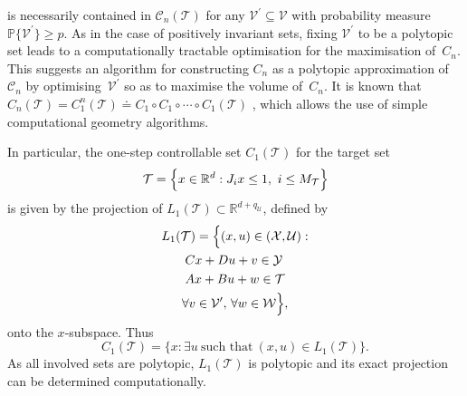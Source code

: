 \documentclass{ifacconf}
\providecommand{\C}{\mathscr C}
\providecommand{\W}{\mathcal W}
\providecommand{\V}{\mathcal V}
\providecommand{\X}{\mathcal X}
\providecommand{\Y}{\mathcal Y}
\providecommand{\U}{\mathcal U}
\providecommand{\T}{\mathcal T}
\providecommand{\PP}{\mathbb P}
\providecommand{\RR}{\mathbb R}
\begin{document}
%
is necessarily contained in $\C_n(\T)$ for any $\V^\prime\subseteq\V$ with probability measure $\PP\{\V^\prime\} \geq p$.
%
As in the case of positively invariant sets, fixing $\V^\prime$ to be a polytopic set leads to a computationally tractable optimisation for the maximisation of~$C_n$. This suggests an algorithm for constructing $C_n$ as a polytopic approximation of~$\C_n$ by optimising~$\V^\prime$ so as to maximise the volume of~$C_n$.
%
It is known that 
$C_n(\T) = C^n_1(\T) \doteq C_1 \circ C_1 \circ \cdots \circ C_1(\T)$ 
\citep[see e.g.][]{blanchini:2007}, which allows the use of simple computational geometry algorithms.

In particular, the one-step controllable set $C_1(\T)$ for the target set 
\[
\T = \Bigl\{x\in\RR^d : J_i x\leq1,\ i\leq M_\T\Bigr\}
\]
is given by the projection of
$L_1(\T)\subset \RR^{d+q_{\U}}$, 
defined by
%
\begin{multline*}
L_1(\T) = \Bigl\{(x,u)\in (\X,\U): \\
\begin{aligned}
& Cx+Du + v\in\Y \\
& Ax+Bu+w\in\T
\end{aligned}\\
\forall v\in\V^\prime,\, \forall w\in\W\Bigr\} ,
\end{multline*}
%
onto the $x$-subspace.
%
Thus
\[
C_1(\T) = \{ x : \exists u \ \text{such that} \ (x,u)\in L_1(\T)\}.
\]
As all involved sets are polytopic, $L_1(\T)$ is polytopic and its exact projection can be determined computationally.
\end{document}
